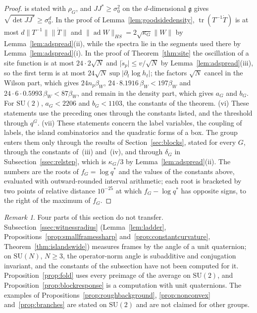 \documentclass[11pt]{amsart}
\theoremstyle{definition}
\theoremstyle{remark}
\newtheorem{remark}[theorem]{Remark}
\numberwithin{equation}{section}
\newcommand{\SU}{\mathrm{SU}}
\newcommand{\g}{\mathfrak{g}}
\begin{document}
\begin{proof}
is stated with $\rho_G$, and $JJ^*\ge\sigma_0^2$ on the $d$-dimensional
$\g$ gives $\sqrt{\det JJ^*}\ge\sigma_0^d$. In the proof of
Lemma~\ref{lem:goodsidedensity}, $\operatorname{tr}(T^{-1}\dot T)$ is at
most $d\lVert T^{-1}\rVert\lVert\dot T\rVert$ and $\lVert\operatorname{ad}
W\rVert_{HS}=2\sqrt{\kappa_G}\lVert W\rVert$ by Lemma~\ref{lem:adspread}(ii),
while the spectra lie in the segments used there by
Lemma~\ref{lem:adspread}(i). In the proof of Theorem~\ref{thm:site} the
oscillation of a site function is at most $24\cdot2\sqrt N$ and
$\lvert\dot s_p\rvert\le v/\sqrt N$ by Lemma~\ref{lem:adspread}(iii), so
the first term is at most $24\sqrt N\sup\lvert\partial_t\log h_t\rvert$;
the factors $\sqrt N$ cancel in the Wilson part, which gives $24n_p\beta_W$,
$24\cdot8.1916\,\beta_W<197\beta_W$ and $24\cdot6\cdot0.5993\,\beta_W<
87\beta_W$, and remain in the density part, which gives $a_G$ and $b_G$.
For $\SU(2)$, $a_G<2206$ and $b_G<1103$, the constants of the theorem.
(vi) These statements use the preceding ones through the constants
listed, and the threshold through $q^G$.
(vii) These statements concern the label variables, the coupling of
labels, the island combinatorics and the quadratic forms of a box. The
group enters them only through the results of Section~\ref{sec:blocks},
stated for every $G$, through the constants of~(iii) and~(iv), and
through $\delta_G$ in Subsection~\ref{ssec:relstep}, which is
$\kappa_G/3$ by Lemma~\ref{lem:adspread}(ii).
The numbers are the roots of $f_G=\log q^*$ and the values of the
constants above, evaluated with outward-rounded interval arithmetic; each
root is bracketed by two points of relative distance $10^{-25}$ at which
$f_G-\log q^*$ has opposite signs, to the right of the maximum of $f_G$.
\end{proof}

\begin{remark}\label{rem:groups13}
Four parts of this section do not transfer. Subsection~\ref{ssec:witnessradius}
(Lemma~\ref{lem:ladder}, Propositions~\ref{prop:smallframessharp}
and~\ref{prop:constantcurvature}, Theorem~\ref{thm:islandswide}) measures
frames by the angle of a unit quaternion; on $\SU(N)$, $N\ge3$, the
operator-norm angle is subadditive and conjugation invariant, and the
constants of the subsection have not been computed for it. Proposition~\ref{prop:fold}
uses every preimage of the average on $\SU(2)$, and
Proposition~\ref{prop:blockresponse} is a computation with unit
quaternions. The examples of
Propositions~\ref{prop:roughbackground}, \ref{prop:nonconvex}
and~\ref{prop:branches} are stated on $\SU(2)$ and are not claimed for
other groups.
\end{remark}
\end{document}
